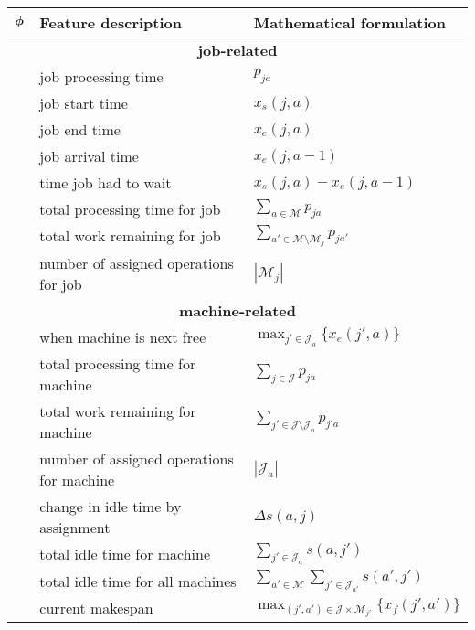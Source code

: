 \centering
\scriptsize
\begin{tabular}{cll} %
	\toprule
	$\bm{\phi}$ & Feature description & Mathematical formulation \\ 
	\midrule
	\multicolumn{3}{c}{\textbf{job-related}}\\
	\phiproc & job processing time & $p_{ja}$ \\
	\phistartTime & job start time & $x_s(j,a)$ \\
	\phiendTime & job end time & $x_e(j,a)$ \\
	\phiarrivalTime & job arrival time & $x_e(j,a-1)$\\
	\phiwait & time job had to wait & $x_s(j,a)-x_e(j,a-1)$ \\
	\phijobTotProcTime & total processing time for job & 
 $\sum_{a\in \mathcal{M}}p_{ja}$ \\
	\phijobWrm & total work remaining for job & 
	$\sum_{a'\in\mathcal{M}\setminus \mathcal{M}_{j}}p_{ja'}$ \\
	\phijobOps & number of assigned operations for job & 
	$|\mathcal{M}_j|$ \\
	\midrule
	\multicolumn{3}{c}{\textbf{machine-related}}\\
	\phimacFree & when machine is next free & 
 $\max_{j'\in \mathcal{J}_a} \{x_e(j',a)\}$ \\
	\phimacTotProcTime & total processing time for machine & 
 $\sum_{j\in \mathcal{J}}p_{ja}$ \\
	\phimacWrm & total work remaining for machine & 
	$\sum_{j'\in\mathcal{J}\setminus \mathcal{J}_{a}}p_{j'a}$ \\
	\phimacOps & number of assigned operations for machine & 
	$|\mathcal{J}_a|$ \\
	\phireducedSlack & change in idle time by assignment & 
 $\Delta s(a,j)$ \\
	\phimacSlack & total idle time for machine & 
 $\sum_{j'\in \mathcal{J}_a}s(a,j')$ \\
	\phiallSlack & total idle time for all machines & $\sum_{a'\in 
	\mathcal{M}}\sum_{j'\in \mathcal{J}_{a'}}s(a',j')$ \\
	\phimakespan & current makespan &
 $\max_{(j',a')\in \mathcal{J} \times \mathcal{M}_{j'}}\{x_f(j',a')\}$ \\
	\bottomrule
\end{tabular}